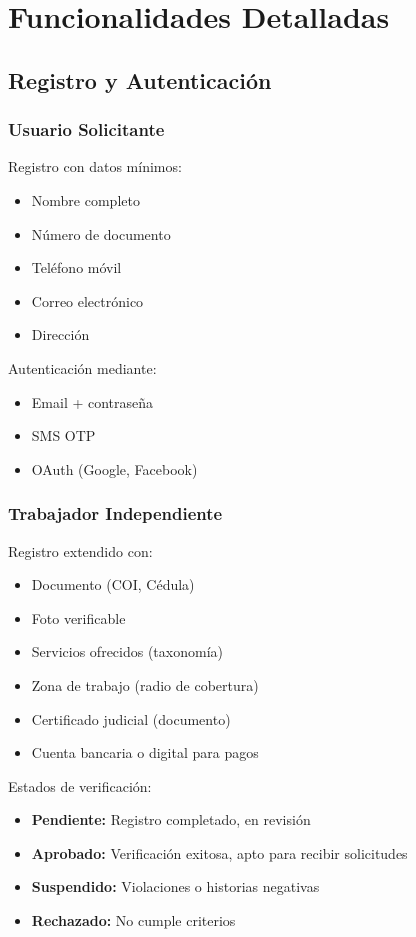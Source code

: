 \documentclass[12pt,a4paper,spanish]{article}
\begin{document}
\section{Funcionalidades Detalladas}

\subsection{Registro y Autenticación}

\subsubsection{Usuario Solicitante}

Registro con datos mínimos:
\begin{itemize}
    \item Nombre completo
    \item Número de documento
    \item Teléfono móvil
    \item Correo electrónico
    \item Dirección
\end{itemize}

Autenticación mediante:
\begin{itemize}
    \item Email + contraseña
    \item SMS OTP
    \item OAuth (Google, Facebook)
\end{itemize}

\subsubsection{Trabajador Independiente}

Registro extendido con:
\begin{itemize}
    \item Documento (COI, Cédula)
    \item Foto verificable
    \item Servicios ofrecidos (taxonomía)
    \item Zona de trabajo (radio de cobertura)
    \item Certificado judicial (documento)
    \item Cuenta bancaria o digital para pagos
\end{itemize}

Estados de verificación:
\begin{itemize}
    \item \textbf{Pendiente:} Registro completado, en revisión
    \item \textbf{Aprobado:} Verificación exitosa, apto para recibir solicitudes
    \item \textbf{Suspendido:} Violaciones o historias negativas
    \item \textbf{Rechazado:} No cumple criterios
\end{itemize}
\end{document}
